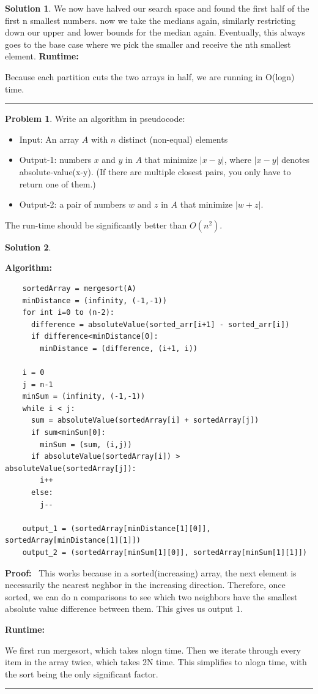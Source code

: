 \documentclass{article}
\theoremstyle{definition}
\newtheorem{problem}{Problem}
\def\fline{\rule{0.75\linewidth}{0.5pt}}
\newcommand{\finishline}{
  \begin{center}\fline
\end{center}}
\newtheorem*{solution*}{Solution}
\newenvironment{solution}{
\begin{solution*}}{{\finishline}
\end{solution*}}
\begin{document}
\begin{solution}
  We now have halved our search space and found the first half of the first n smallest numbers. now we take the medians again, similarly restricting down our upper and lower bounds for the median again. Eventually, this always goes to the base case where we pick the smaller and receive the nth smallest element.
  \textbf{Runtime:}
  \

  Because each partition cuts the two arrays in half, we are running in O(logn) time.
\end{solution}

\newpage

\begin{problem}
  Write an algorithm in pseudocode:

  \begin{itemize}
    \item Input: An array $A$ with $n$ distinct (non-equal) elements
    \item Output-1: numbers $x$ and $y$ in $A$ that minimize $|x-y|$, where $|x-y|$ denotes absolute-value(x-y). (If there are multiple closest pairs, you only have to return one of them.)
    \item Output-2: a pair of numbers $w$ and $z$ in $A$ that minimize $|w+z|.$
  \end{itemize}
  The run-time should be significantly better than $O(n^2)$.

\end{problem}

\begin{solution}
  \

  \textbf{Algorithm:}
  \

  \begin{verbatim}
    sortedArray = mergesort(A)
    minDistance = (infinity, (-1,-1))
    for int i=0 to (n-2):
      difference = absoluteValue(sorted_arr[i+1] - sorted_arr[i])
      if difference<minDistance[0]:
        minDistance = (difference, (i+1, i))

    i = 0
    j = n-1
    minSum = (infinity, (-1,-1))
    while i < j:
      sum = absoluteValue(sortedArray[i] + sortedArray[j])
      if sum<minSum[0]:
        minSum = (sum, (i,j))
      if absoluteValue(sortedArray[i]) > absoluteValue(sortedArray[j]):
        i++
      else:
        j--

    output_1 = (sortedArray[minDistance[1][0]], sortedArray[minDistance[1][1]])
    output_2 = (sortedArray[minSum[1][0]], sortedArray[minSum[1][1]])
  \end{verbatim}

  \textbf{Proof:}
  \
  This works because in a sorted(increasing) array, the next element is necessarily the nearest neghbor in the increasing direction. Therefore, once sorted, we can do n comparisons to see which two neighbors have the smallest absolute value difference between them. This gives us output 1.

  \textbf{Runtime:}
  \

  We first run mergesort, which takes nlogn time. Then we iterate through every item in the array twice, which takes 2N time. This simplifies to nlogn time, with the sort being the only significant factor.
\end{solution}
\end{document}
